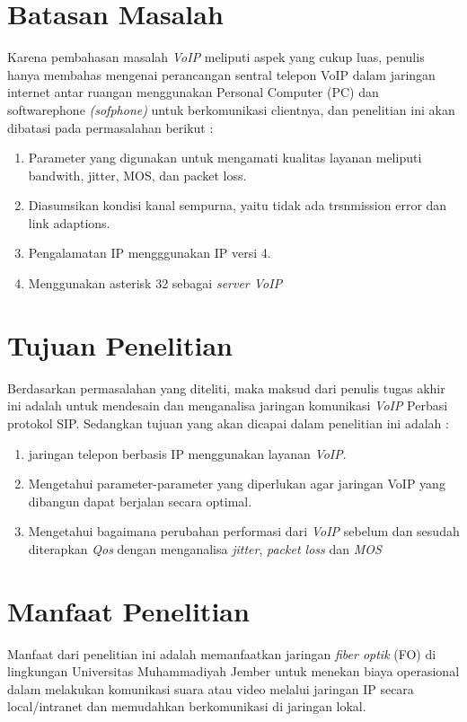 \documentclass{jtetiproposalskripsi}
\begin{document}
\section{Batasan Masalah}
Karena pembahasan masalah \emph{VoIP} meliputi aspek yang cukup luas, penulis hanya membahas mengenai perancangan sentral telepon VoIP dalam jaringan internet antar ruangan menggunakan Personal Computer (PC) dan softwarephone \emph{(sofphone)} untuk berkomunikasi clientnya, dan penelitian ini akan dibatasi pada permasalahan berikut :

\begin{enumerate}
\item Parameter yang digunakan untuk mengamati kualitas layanan meliputi bandwith, jitter, MOS, dan packet loss.
\item Diasumsikan kondisi kanal sempurna, yaitu tidak ada trsnmission error dan link adaptions.
\item Pengalamatan IP mengggunakan IP versi 4.
\item Menggunakan asterisk 32 sebagai \emph{server VoIP}
\end{enumerate}

\section{Tujuan Penelitian}
Berdasarkan permasalahan yang diteliti, maka maksud dari penulis tugas akhir ini adalah untuk mendesain dan menganalisa jaringan komunikasi \emph{VoIP} Perbasi protokol SIP.
Sedangkan tujuan yang akan dicapai dalam penelitian ini adalah :
\begin{enumerate}
\item jaringan telepon berbasis IP menggunakan layanan \emph{VoIP}.
\item Mengetahui parameter-parameter yang diperlukan agar jaringan VoIP yang dibangun dapat berjalan secara optimal.
\item Mengetahui bagaimana perubahan performasi dari \emph{VoIP} sebelum dan sesudah diterapkan \emph{Qos} dengan menganalisa \emph{jitter}, \emph{packet loss} dan \emph{MOS}
\end{enumerate}

\section{Manfaat Penelitian}
Manfaat dari penelitian ini adalah memanfaatkan jaringan \emph{fiber optik} (FO) di lingkungan Universitas Muhammadiyah Jember untuk menekan biaya operasional dalam melakukan komunikasi suara atau video melalui jaringan IP secara local/intranet dan memudahkan berkomunikasi di jaringan lokal.
\end{document}
